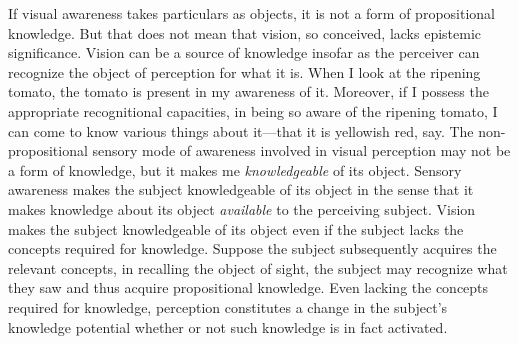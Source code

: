 \documentclass[12pt]{article}
\begin{document}

If visual awareness takes particulars as objects, it is not a form of propositional knowledge. But that does not mean that vision, so conceived, lacks epistemic significance. Vision can be a source of knowledge insofar as the perceiver can recognize the object of perception for what it is. When I look at the ripening tomato, the tomato is present in my awareness of it. Moreover, if I possess the appropriate recognitional capacities, in being so aware of the ripening tomato, I can come to know various things about it---that it is yellowish red, say. The non-propositional sensory mode of awareness involved in visual perception may not be a form of knowledge, but it makes me \emph{knowledgeable} of its object. Sensory awareness makes the subject knowledgeable of its object in the sense that it makes knowledge about its object \emph{available} to the perceiving subject. Vision makes the subject knowledgeable of its object even if the subject lacks the concepts required for knowledge. Suppose the subject subsequently acquires the relevant concepts, in recalling the object of sight, the subject may recognize what they saw and thus acquire propositional knowledge. Even lacking the concepts required for knowledge, perception constitutes a change in the subject's knowledge potential whether or not such knowledge is in fact activated.
\end{document}

